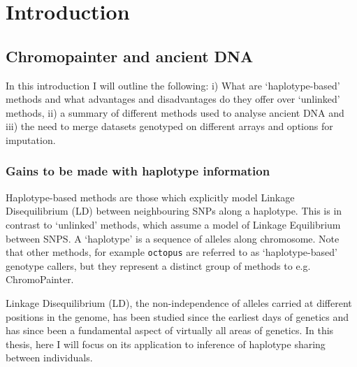 \chapter{Introduction}

\section{Chromopainter and ancient DNA}

In this introduction I will outline the following: i) What are `haplotype-based' methods and what advantages and disadvantages do they offer over `unlinked' methods, ii) a summary of different methods used to analyse ancient DNA and iii) the need to merge datasets genotyped on different arrays and options for imputation. 

\subsection{Gains to be made with haplotype information}

Haplotype-based methods are those which explicitly model Linkage Disequilibrium (LD) between neighbouring SNPs along a haplotype. This is in contrast to `unlinked' methods, which assume a model of Linkage Equilibrium between SNPS. A `haplotype' is a sequence of alleles along chromosome. Note that other methods, for example \texttt{octopus} \cite{octopus} are referred to as `haplotype-based' genotype callers, but they represent a distinct group of methods to e.g. ChromoPainter.  

Linkage Disequilibrium (LD), the non-independence of alleles carried at different positions in the genome, has been studied since the earliest days of genetics \cite{morgan1912complete, bateson1902experiments} and has since been a fundamental aspect of virtually all areas of genetics. In this thesis, here I will focus on its application to inference of haplotype sharing between individuals. 

